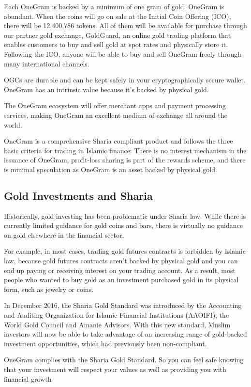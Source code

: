 \documentclass[letterpaper,11pt]{article}
\begin{document}
Each OneGram is backed by a minimum of one gram of gold. OneGram is abundant. When the coins will go on sale at the Initial Coin Offering (ICO), there will be 12,400,786 tokens. All of them will be available for purchase through our partner gold exchange, GoldGuard, an online gold trading platform that enables customers to buy and sell gold at spot rates and physically store it. Following the ICO, anyone will be able to buy and sell OneGram freely through many international channels.

OGCs are durable and can be kept safely in your cryptographically secure wallet. OneGram has an intrinsic value because it’s backed by physical gold. 

The OneGram ecosystem will offer merchant apps and payment processing services, making OneGram an excellent medium of exchange all around the world.

OneGram is a comprehensive Sharia compliant product and follows the three basic criteria for trading in Islamic finance: There is no interest mechanism in the issuance of OneGram, profit-loss sharing is part of the rewards scheme, and there is minimal speculation as OneGram is an asset backed by physical gold.


\subsection{Gold Investments and Sharia}

Historically, gold-investing has been problematic under Sharia law. While there is currently limited guidance for gold coins and bars, there is virtually no guidance on gold elsewhere in the financial sector\cite{bakar}.

For example, in most cases, trading gold futures contracts is forbidden by Islamic law, because gold futures contracts aren’t backed by physical gold and you can end up paying or receiving interest on your trading account. As a result, most people who wanted to buy gold as an investment purchased gold in its physical form, such as jewelry or coins.

In December 2016, the Sharia Gold Standard was introduced by the Accounting and Auditing Organization for Islamic Financial Institutions (AAOIFI), the World Gold Council and Amanie Advisors. With this new standard, Muslim investors will now be able to take advantage of an increasing range of gold-backed investment opportunities, which had previously been non-compliant.

OneGram complies with the Sharia Gold Standard. So you can feel safe knowing that your investment will respect your values as well as providing you with financial growth
\end{document}
